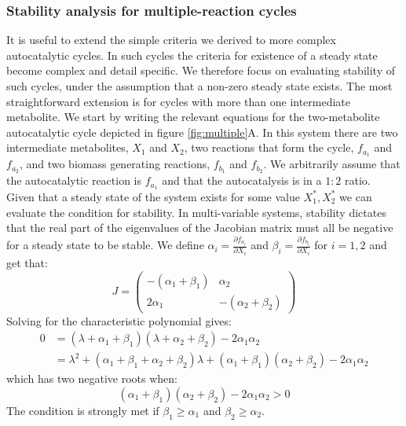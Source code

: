     \subsubsection{Stability analysis for multiple-reaction cycles}
    It is useful to extend the simple criteria we derived to more complex autocatalytic cycles.
    In such cycles the criteria for existence of a steady state become complex and detail specific.
    We therefore focus on evaluating stability of such cycles, under the assumption that a non-zero steady state exists.
    The most straightforward extension is for cycles with more than one intermediate metabolite.
    We start by writing the relevant equations for the two-metabolite autocatalytic cycle depicted in figure \ref{fig:multiple}A.
    In this system there are two intermediate metabolites, $X_1$ and $X_2$, two reactions that form the cycle, $f_{a_1}$ and $f_{a_2}$, and two biomass generating reactions, $f_{b_1}$ and $f_{b_2}$.
    We arbitrarily assume that the autocatalytic reaction is $f_{a_1}$ and that the autocatalysis is in a $1:2$ ratio.
    Given that a steady state of the system exists for some value $X_1^*,X_2^*$ we can evaluate the condition for stability.
    In multi-variable systems, stability dictates that the real part of the eigenvalues of the Jacobian matrix must all be negative for a steady state to be stable.
    We define $\alpha_i=\frac{\partial f_{a_i}}{\partial X_i}$ and $\beta_i=\frac{\partial f_{b_i}}{\partial X_i}$ for $i=1,2$ and get that:
    \begin{equation*}
        J=
        \begin{pmatrix}
            -(\alpha_1+\beta_1) & \alpha_2 \\
            2\alpha_1 & -(\alpha_2+\beta_2)
        \end{pmatrix}
    \end{equation*}
    Solving for the characteristic polynomial gives:
    \begin{align*}
        0 & =(\lambda+\alpha_1+\beta_1)(\lambda+\alpha_2+\beta_2)-2\alpha_1\alpha_2 \\
        & = \lambda^2+(\alpha_1+\beta_1+\alpha_2+\beta_2)\lambda+(\alpha_1+\beta_1)(\alpha_2+\beta_2)-2\alpha_1\alpha_2
    \end{align*}
    which has two negative roots when:
    \begin{equation*}
        (\alpha_1+\beta_1)(\alpha_2+\beta_2)-2\alpha_1\alpha_2>0
    \end{equation*}
    The condition is strongly met if $\beta_1\geq \alpha_1$ and $\beta_2\geq\alpha_2$.
    

